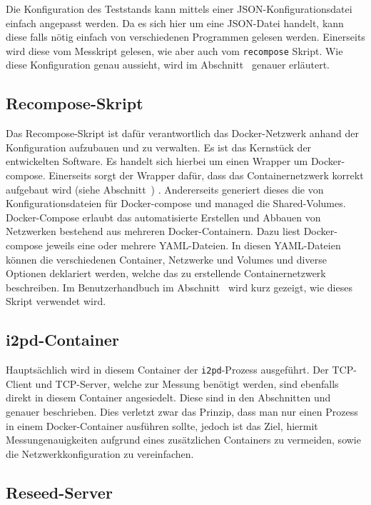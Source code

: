 Die Konfiguration des Teststands kann mittels einer JSON-Konfigurationsdatei einfach angepasst werden.
Da es sich hier um eine JSON-Datei handelt, kann diese falls nötig einfach von verschiedenen Programmen gelesen werden.
Einerseits wird diese vom Messkript gelesen, wie aber auch vom \lstinline|recompose| Skript.
Wie diese Konfiguration genau aussieht, wird im Abschnitt~ genauer erläutert.

\subsection{Recompose-Skript}

Das Recompose-Skript ist dafür verantwortlich das Docker-Netzwerk anhand der Konfiguration aufzubauen und zu verwalten.
Es ist das Kernstück der entwickelten Software.
Es handelt sich hierbei um einen Wrapper um Docker-compose.
Einerseits sorgt der Wrapper dafür, dass das Containernetzwerk korrekt aufgebaut wird (siehe Abschnitt~) .
Andererseits generiert dieses die von Konfigurationsdateien für Docker-compose und managed die Shared-Volumes.
Docker-Compose erlaubt das automatisierte Erstellen und Abbauen von Netzwerken bestehend aus mehreren Docker-Containern.
Dazu liest Docker-compose jeweils eine oder mehrere YAML-Dateien.
In diesen YAML-Dateien können die verschiedenen Container, Netzwerke und Volumes und diverse Optionen deklariert werden, welche das zu erstellende Containernetzwerk beschreiben.
Im Benutzerhandbuch im Abschnitt~ wird kurz gezeigt, wie dieses Skript verwendet wird.

\subsection{i2pd-Container}

Hauptsächlich wird in diesem Container der \lstinline|i2pd|-Prozess ausgeführt.
Der TCP-Client und TCP-Server, welche zur Messung benötigt werden, sind ebenfalls direkt in diesem Container angesiedelt.
Diese sind in den Abschnitten  und  genauer beschrieben.
Dies verletzt zwar das Prinzip, dass man nur einen Prozess in einem Docker-Container ausführen sollte,
jedoch ist das Ziel, hiermit Messungenauigkeiten aufgrund eines zusätzlichen Containers zu vermeiden, sowie die Netzwerkkonfiguration zu vereinfachen.

\subsection{Reseed-Server}

